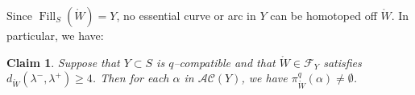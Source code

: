 \documentclass[11pt,letterpaper]{amsart}
\newcommand{\dfnote}[1]{\todo[color=darkgreen,linecolor=darkgreen,size= \footnotesize]{#1}}
\newcommand{\A}[0]{\mathcal{A}}
\newcommand{\Fill}{\operatorname{Fill}}
\newcommand{\mc}{\mathcal}
\newcommand{\mr}{\mathring}
\newcommand{\psub}{\mr W}
\numberwithin{equation}{section}
\newtheorem{lemma}[theorem]{Lemma}
\newtheorem{claim}[theorem]{Claim}
\theoremstyle{definition}
\newcommand{\C}{\mathcal{C}}
\newcommand{\AC}{\mathcal{AC}}
\newcommand{\from}{\colon} %
\newcommand{\sam}[1]{{\color{blue}{#1}}}
\begin{document}
Since $\Fill_S(\psub) = Y$, no essential curve or arc in $Y$ can be homotoped off $\psub$. In particular, we have:

\begin{claim} \label{claim:nonempty}
Suppose that $Y \subset S$ is $q$--compatible and that $\psub \in \mc F_Y$ satisfies  $d_{\psub}(\lambda^-, \lambda^+) \geq 4$. Then for each $\alpha$ in $\mc {AC}(Y)$, we have $\pi^q_{\psub}(\alpha) \neq \emptyset$.
\end{claim}





%
%
%
\end{document}
